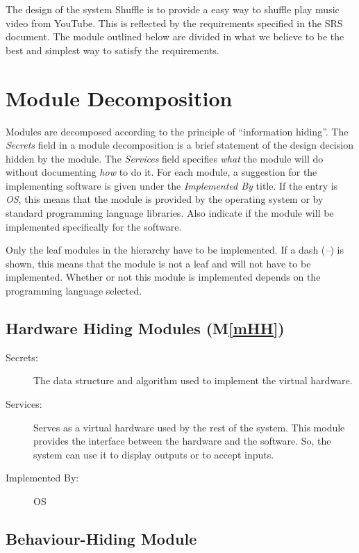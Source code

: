 \documentclass[12pt, titlepage]{article}
\newcommand{\mref}[1]{M\ref{#1}}
\begin{document}
\color{red}The design of the system Shuffle is to provide a easy way to shuffle play music video from YouTube.  This is reflected by the requirements specified in the SRS document.  The module outlined below are divided in what we believe to be the best and simplest way to satisfy the requirements.\color{black}

\section{Module Decomposition} \label{SecMD}

Modules are decomposed according to the principle of ``information hiding''. The \emph{Secrets} field in a module
decomposition is a brief statement of the design decision hidden by the
module. The \emph{Services} field specifies \emph{what} the module will do
without documenting \emph{how} to do it. For each module, a suggestion for the
implementing software is given under the \emph{Implemented By} title. If the
entry is \emph{OS}, this means that the module is provided by the operating
system or by standard programming language libraries.  Also indicate if the
module will be implemented specifically for the software.

Only the leaf modules in the
hierarchy have to be implemented. If a dash (\emph{--}) is shown, this means
that the module is not a leaf and will not have to be implemented. Whether or
not this module is implemented depends on the programming language
selected.

\subsection{Hardware Hiding Modules (\mref{mHH})}

\begin{description}
\item[Secrets:]The data structure and algorithm used to implement the virtual
  hardware.
\item[Services:]Serves as a virtual hardware used by the rest of the
  system. This module provides the interface between the hardware and the
  software. So, the system can use it to display outputs or to accept inputs.
\item[Implemented By:] OS
\end{description}

\subsection{Behaviour-Hiding Module}
\end{document}
